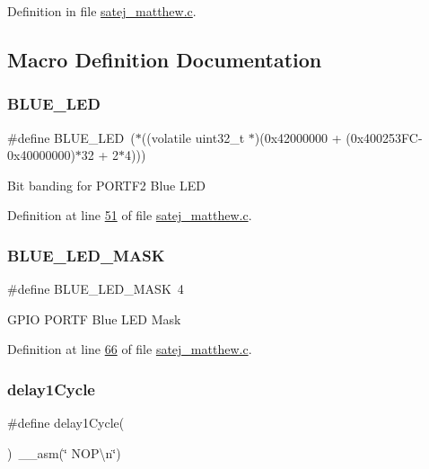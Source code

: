 Definition in file \mbox{\hyperlink{satej__matthew_8c_source}{satej\+\_\+matthew.\+c}}.



\subsection{Macro Definition Documentation}
\mbox{\label{satej__matthew_8c_a41c7fcbe209a1c236fd1b8e35bd8b55a}} 
\subsubsection{\texorpdfstring{BLUE\_LED}{BLUE\_LED}}
{\footnotesize\ttfamily \#define B\+L\+U\+E\+\_\+\+L\+ED~($\ast$((volatile uint32\+\_\+t $\ast$)(0x42000000 + (0x400253\+F\+C-\/0x40000000)$\ast$32 + 2$\ast$4)))}

Bit banding for P\+O\+R\+T\+F2 Blue L\+ED 

Definition at line \mbox{\hyperlink{satej__matthew_8c_source_l00051}{51}} of file \mbox{\hyperlink{satej__matthew_8c_source}{satej\+\_\+matthew.\+c}}.

\mbox{\label{satej__matthew_8c_a6f2788e548d65bbb864b965c72a7bf56}} 
\subsubsection{\texorpdfstring{BLUE\_LED\_MASK}{BLUE\_LED\_MASK}}
{\footnotesize\ttfamily \#define B\+L\+U\+E\+\_\+\+L\+E\+D\+\_\+\+M\+A\+SK~4}

G\+P\+IO P\+O\+R\+TF Blue L\+ED Mask 

Definition at line \mbox{\hyperlink{satej__matthew_8c_source_l00066}{66}} of file \mbox{\hyperlink{satej__matthew_8c_source}{satej\+\_\+matthew.\+c}}.

\mbox{\label{satej__matthew_8c_a056fe4f6b582ad913e07654bb2bf1980}} 
\subsubsection{\texorpdfstring{delay1Cycle}{delay1Cycle}}
{\footnotesize\ttfamily \#define delay1\+Cycle(\begin{DoxyParamCaption}{ }\end{DoxyParamCaption})~\+\_\+\+\_\+asm(\char`\"{} N\+O\+P\textbackslash{}n\char`\"{})}

